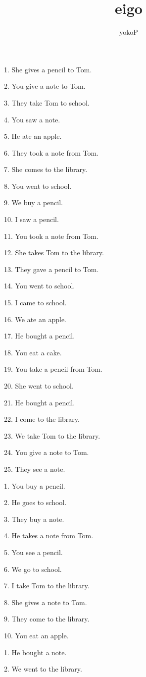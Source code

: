 \documentclass[uplatex,
paper=a4,
fontsize=18pt,
jafontsize=16pt,
number_of_lines=30,
line_length=30zh,
baselineskip=25pt,
]{jlreq}
\author{yokoP}
\title{eigo}
\begin{document}
1.  She gives a pencil to Tom.

2.  You give a note to Tom.

3.  They take Tom to school.

4.  You saw a note.

5.  He ate an apple.

6.  They took a note from Tom.

7.  She comes to the library.

8.  You went to school.

9.  We buy a pencil.

10.  I saw a pencil.

11.  You took a note from Tom.

12.  She takes Tom to the library.

13.  They gave a pencil to Tom.

14.  You went to school.

15.  I came to school.

16.  We ate an apple.

17.  He bought a pencil.

18.  You eat a cake.

19.  You take a pencil from Tom.

20.  She went to school.

21.  He bought a pencil.

22.  I come to the library.

23.  We take Tom to the library.

24.  You give a note to Tom.

25.  They see a note.


\newpage
{}
1.  You buy a pencil.

2.  He goes to school.

3.  They buy a note.

4.  He takes a note from Tom.

5.  You see a pencil.

6.  We go to school.

7.  I take Tom to the library.

8.  She gives a note to Tom.

9.  They come to the library.

10.  You eat an apple.


\newpage
{}
1.  He bought a note.

2.  We went to the library.
\end{document}
